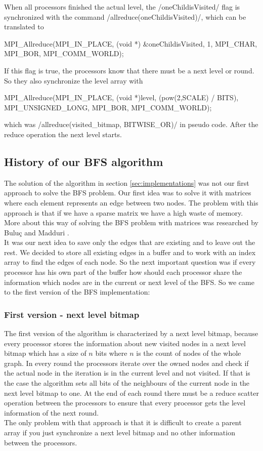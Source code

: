 \documentclass[12pt,a4paper]{article}
\begin{document}
When all processors finished the actual level, the \cinline/oneChildisVisited/ flag is synchronized with the command \cinline/allreduce(oneChildisVisited)/, which can be translated to
\begin{ccode}
MPI_Allreduce(MPI_IN_PLACE, (void *) &oneChildisVisited, 1, MPI_CHAR, MPI_BOR, MPI_COMM_WORLD);
\end{ccode}
If this flag is true, the processors know that there must be a next level or round. So they also synchronize the level array with
\begin{ccode}
MPI_Allreduce(MPI_IN_PLACE, (void *)level, (pow(2,SCALE) / BITS), MPI_UNSIGNED_LONG, MPI_BOR, MPI_COMM_WORLD);
\end{ccode}
which was \cinline/allreduce(visited_bitmap, BITWISE_OR)/ in pseudo code. After the reduce operation the next level starts.

\subsection{History of our BFS algorithm}
\label{sec:versions}

The solution of the algorithm in section \ref{sec:implementations} was not our first approach to solve the BFS problem. Our first idea was to solve it with matrices where each element represents an edge between two nodes. The problem with this approach is that if we have a sparse matrix we have a high waste of memory. More about this way of solving the BFS problem with matrices was researched by Buluç and Madduri \cite{matrices}.\\
It was our next idea to save only the edges that are existing and to leave out the rest. We decided to store all existing edges in a buffer and to work with an index array to find the edges of each node. So the next important question was if every processor has his own part of the buffer how should each processor share the information which nodes are in the current or next level of the BFS. So we came to the first version of the BFS implementation:

\subsubsection{First version - next level bitmap}
\label{sec:firstversion}

The first version of the algorithm is characterized by a next level bitmap, because every processor stores the information about new visited nodes in a next level bitmap which has a size of \(n\) bits where \(n\) is the count of nodes of the whole graph. In every round the processors iterate over the owned nodes and check if the actual node in the iteration is in the current level and not visited. If that is the case the algorithm sets all bits of the neighbours of the current node in the next level bitmap to one. At the end of each round there must be a reduce scatter operation between the processors to ensure that every processor gets the level information of the next round.\\
The only problem with that approach is that it is difficult to create a parent array if you just synchronize a next level bitmap and no other information between the processors.
\end{document}
